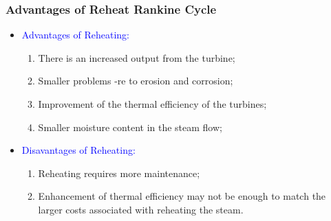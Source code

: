 \documentclass[10pt,compress,handout,ignorenonframetext]{beamer}
\begin{document}
\begin{frame}
 \frametitle{Advantages of Reheat Rankine Cycle}
 \begin{itemize}
  \item <1->\textcolor{blue}{Advantages of Reheating:}
   \begin{enumerate}
    \item <2-> There is an increased output from the turbine;
    \item <3-> Smaller problems -re to erosion and corrosion;
    \item <4-> Improvement of the thermal efficiency of the turbines;
    \item <5-> Smaller moisture content in the steam flow;
   \end{enumerate}
  \item <6->\textcolor{blue}{Disavantages of Reheating:}
   \begin{enumerate}
    \item <7-> Reheating requires more maintenance;
    \item <8-> Enhancement of thermal efficiency may not be enough to match the larger costs associated with reheating the steam.
   \end{enumerate}
 \end{itemize}
\end{frame}
\end{document}
